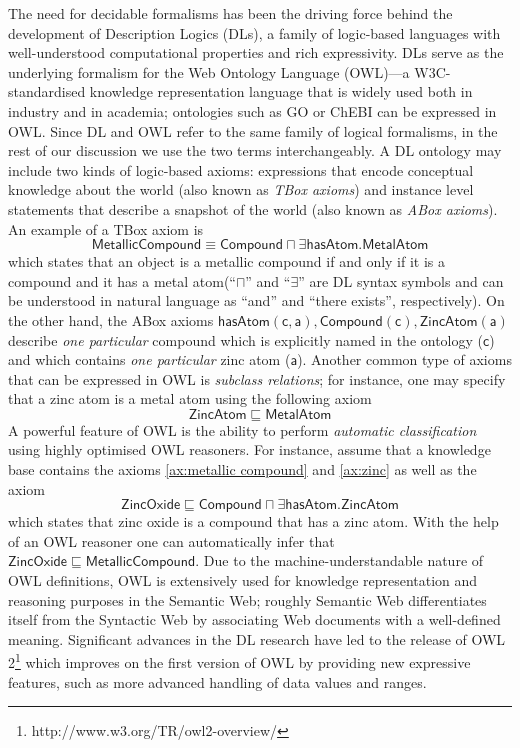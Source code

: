\documentclass[10pt]{bmc_article}
\newenvironment{bmcformat}{\baselineskip20pt\sloppy\setboolean{publ}{false}}{\baselineskip20pt\sloppy}
\begin{document}
\begin{bmcformat}
The need for decidable formalisms has been the driving force behind the development of Description Logics (DLs), a family of logic-based languages with well-understood computational properties and rich expressivity. DLs serve as the underlying formalism for the Web Ontology Language (OWL)---a W3C-standardised  knowledge representation language that is widely used both in industry and in academia; ontologies such as GO or ChEBI can be expressed in OWL. Since DL and OWL refer to the same family of logical formalisms, in the rest of our discussion we use the two terms interchangeably.
A DL ontology may include two kinds of logic-based axioms: expressions that encode conceptual knowledge about the world (also known as \emph{TBox axioms}) and instance level statements that describe a snapshot of the world (also known as \emph{ABox axioms}). An example of a TBox axiom is \begin{equation}\label{ax:metallic compound}\mathsf{MetallicCompound} \equiv \mathsf{Compound \sqcap \exists hasAtom.MetalAtom}\end{equation} which states that an object is a metallic compound if and only if it is a compound and it has a metal atom(``$\sqcap$'' and ``$\exists$'' are DL syntax symbols and can be understood in natural language as ``and'' and ``there exists'', respectively). On the other hand, the ABox axioms $\mathsf{hasAtom(c,a),Compound(c),ZincAtom(a)}$  describe \emph{one particular} compound which is explicitly named in the ontology ($\mathsf{c}$) and which contains \emph{one particular} zinc atom ($\mathsf{a}$). Another common type of axioms that can be expressed in OWL is \emph{subclass relations}; for instance, one  may specify that a zinc atom is a metal atom using the following axiom
 \begin{equation} \label{ax:zinc}\mathsf{ZincAtom} \sqsubseteq \mathsf{MetalAtom}\end{equation} 
 A powerful feature of OWL is the ability to perform \emph{automatic classification} using highly optimised OWL reasoners. For instance, assume that a knowledge base contains the axioms \eqref{ax:metallic compound} and \eqref{ax:zinc} as well as the axiom \begin{equation}\mathsf{ZincOxide} \sqsubseteq \mathsf{Compound \sqcap \exists hasAtom.ZincAtom}\end{equation} which states that zinc oxide is a compound that has a zinc atom. With the help of an OWL reasoner one can automatically infer that $\mathsf{ZincOxide} \sqsubseteq \mathsf{MetallicCompound}$.
Due to the machine-understandable nature of OWL definitions, OWL is extensively used for knowledge representation and reasoning purposes in the Semantic Web; roughly Semantic Web differentiates itself from the Syntactic Web by associating Web documents with a well-defined meaning. Significant advances in the DL research have led to the release of OWL 2\footnote{http://www.w3.org/TR/owl2-overview/} which improves on the first version of OWL by providing new expressive features, such as more advanced handling of data values and ranges.


\end{bmcformat}
\end{document}
